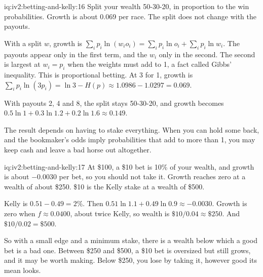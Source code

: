 \begin{solution}{iq:iv2:betting-and-kelly:16}
Split your wealth 50-30-20, in proportion to the win probabilities. Growth is about 0.069 per race. The split does not change with the payouts.

With a split $w$, growth is $\sum_i p_i\ln(w_i o_i) = \sum_i p_i\ln o_i + \sum_i p_i\ln w_i$. The payouts appear only in the first term, and the $w_i$ only in the second. The second is largest at $w_i = p_i$ when the weights must add to 1, a fact called Gibbs' inequality. This is proportional betting. At 3 for 1, growth is $\sum_i p_i\ln(3p_i) = \ln 3 - H(p) \approx 1.0986 - 1.0297 = 0.069$.

With payouts 2, 4 and 8, the split stays 50-30-20, and growth becomes $0.5\ln 1 + 0.3\ln 1.2 + 0.2\ln 1.6 \approx 0.149$.

The result depends on having to stake everything. When you can hold some back, and the bookmaker's odds imply probabilities that add to more than 1, you may keep cash and leave a bad horse out altogether.

\end{solution}

\begin{solution}{iq:iv2:betting-and-kelly:17}
At \$100, a \$10 bet is 10\% of your wealth, and growth is about $-0.0030$ per bet, so you should not take it. Growth reaches zero at a wealth of about \$250. \$10 is the Kelly stake at a wealth of \$500.

Kelly is $0.51 - 0.49 = 2\%$. Then $0.51\ln 1.1 + 0.49\ln 0.9 \approx -0.0030$. Growth is zero when $f \approx 0.0400$, about twice Kelly, so wealth is $\$10/0.04 \approx \$250$. And $\$10/0.02 = \$500$.

So with a small edge and a minimum stake, there is a wealth below which a good bet is a bad one. Between \$250 and \$500, a \$10 bet is oversized but still grows, and it may be worth making. Below \$250, you lose by taking it, however good its mean looks.

\end{solution}

